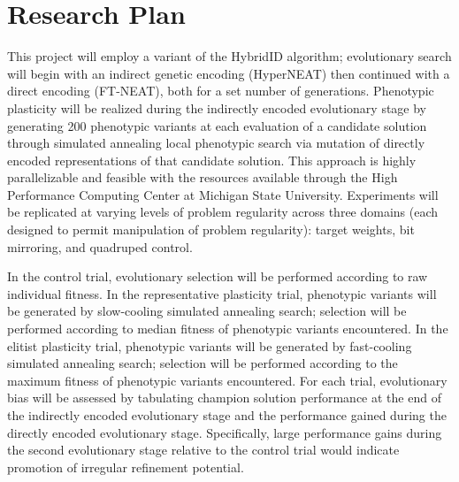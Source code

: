 \renewcommand{\thefootnote}{\fnsymbol{footnote}}
\section{Research Plan}
This project will employ a variant of the HybridID \autocite{Clune2011OnRegularity} algorithm;
evolutionary search will begin with an indirect genetic encoding (HyperNEAT) then continued with a direct encoding (FT-NEAT), both for a set number of generations.
Phenotypic plasticity will be realized during the indirectly encoded evolutionary stage by generating 200 phenotypic variants at each evaluation of a candidate solution through simulated annealing local phenotypic search via mutation of directly encoded representations of that candidate solution.
This approach is highly parallelizable\autocite{Mengistu2016EvolvabilityIt} and feasible with the resources available through the High Performance Computing Center at Michigan State University.
Experiments will be replicated at varying levels of problem regularity across three domains (each designed to permit manipulation of problem regularity): target weights, bit mirroring, and quadruped control.\autocite{Clune2011OnRegularity}

In the control trial, evolutionary selection will be performed according to raw individual fitness.
In the representative plasticity trial, phenotypic variants will be generated by slow-cooling simulated annealing search;
selection will be performed according to median fitness of phenotypic variants encountered.
In the elitist plasticity trial, phenotypic variants will be generated by fast-cooling simulated annealing search;
selection will be performed according to the maximum fitness of phenotypic variants encountered.
For each trial, evolutionary bias will be assessed by tabulating champion solution performance at the end of the indirectly encoded evolutionary stage and the performance gained during the directly encoded evolutionary stage.
Specifically, large performance gains during the second evolutionary stage relative to the control trial would indicate promotion of irregular refinement potential.

